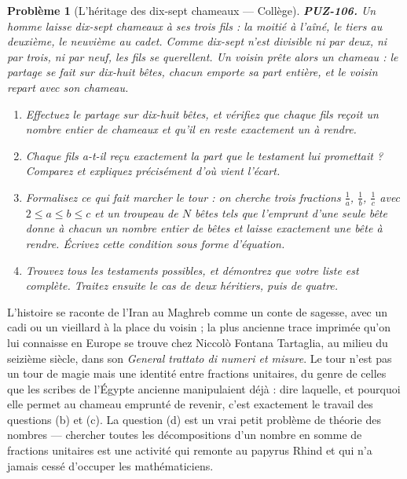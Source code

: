 \documentclass[11pt]{article}
\newtheorem{problem}{Problème}
\begin{document}
\bigskip

\begin{problem}[{L'héritage des dix-sept chameaux --- Collège}]
\textbf{PUZ-106.} Un homme laisse dix-sept chameaux à ses trois fils : la moitié à l'aîné,
le tiers au deuxième, le neuvième au cadet. Comme dix-sept n'est divisible ni par deux, ni par
trois, ni par neuf, les fils se querellent. Un voisin prête alors un chameau : le partage se
fait sur dix-huit bêtes, chacun emporte sa part entière, et le voisin repart avec son
chameau.
\begin{enumerate}
\item[(a)] Effectuez le partage sur dix-huit bêtes, et vérifiez que chaque fils reçoit un nombre
entier de chameaux et qu'il en reste exactement un à rendre.
\item[(b)] Chaque fils a-t-il reçu exactement la part que le testament lui promettait ? Comparez et
expliquez précisément d'où vient l'écart.
\item[(c)] Formalisez ce qui fait marcher le tour : on cherche trois fractions $ \frac{1}{a} $,
$ \frac{1}{b} $, $ \frac{1}{c} $ avec $ 2 \leq a \leq b \leq c $ et un troupeau de
$ N $ bêtes tels que l'emprunt d'une seule bête donne à chacun un nombre entier de bêtes et
laisse exactement une bête à rendre. Écrivez cette condition sous forme d'équation.
\item[(d)] Trouvez tous les testaments possibles, et démontrez que votre liste est complète. Traitez
ensuite le cas de deux héritiers, puis de quatre.
\end{enumerate}

\end{problem}

\noindent L'histoire se raconte de l'Iran au Maghreb comme un conte de sagesse, avec
un cadi ou un vieillard à la place du voisin ; la plus ancienne trace imprimée qu'on lui
connaisse en Europe se trouve chez Niccolò Fontana Tartaglia, au milieu du seizième siècle,
dans son \textit{General trattato di numeri et misure}. Le tour n'est pas un tour de magie mais
une identité entre fractions unitaires, du genre de celles que les scribes de l'Égypte
ancienne manipulaient déjà : dire laquelle, et pourquoi elle permet au chameau emprunté de
revenir, c'est exactement le travail des questions (b) et (c). La question (d) est un vrai
petit problème de théorie des nombres --- chercher toutes les décompositions d'un nombre en
somme de fractions unitaires est une activité qui remonte au papyrus Rhind et qui n'a jamais
cessé d'occuper les mathématiciens.
\end{document}

